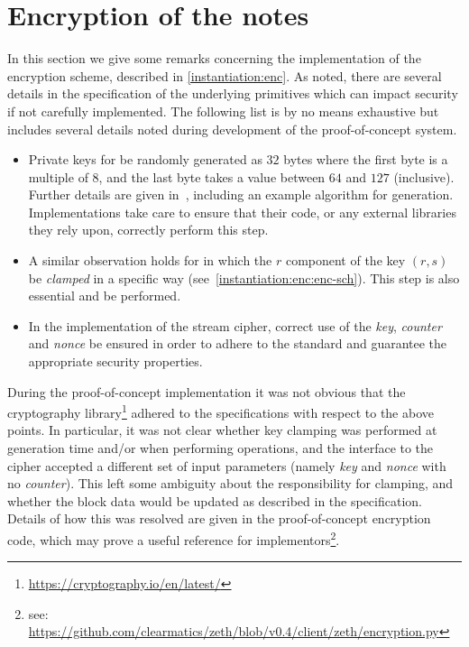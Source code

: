 
\section{Encryption of the notes}\label{implementation:encryption}

In this section we give some remarks concerning the implementation of the \zeth{} encryption scheme, described in \cref{instantiation:enc}. As noted, there are several details in the specification of the underlying primitives which can impact security if not carefully implemented. The following list is by no means exhaustive but includes several details noted during development of the proof-of-concept system.

\begin{itemize}
    \item Private keys for  \MUST{} be randomly generated as $32$ bytes where the first byte is a multiple of $8$, and the last byte takes a value between $64$ and $127$ (inclusive). Further details are given in~\cite{bernstein2006curve25519}, including an example algorithm for generation. Implementations \MUST{} take care to ensure that their code, or any external libraries they rely upon, correctly perform this step.
    \item A similar observation holds for  in which the $r$ component of the \mac{} key $(r, s)$ \MUST{} be \emph{clamped} in a specific way (see~\cref{instantiation:enc:enc-sch}). This step is also essential and \MUST{} be performed.
    \item In the implementation of the \chacha{} stream cipher, correct use of the \emph{key}, \emph{counter} and \emph{nonce} \MUST{} be ensured in order to adhere to the standard and guarantee the appropriate security properties.
\end{itemize}

During the proof-of-concept implementation it was not obvious that the cryptography library\footnote{\url{https://cryptography.io/en/latest/}} adhered to the specifications with respect to the above points. In particular, it was not clear whether key clamping was performed at generation time and/or when performing operations, and the interface to the \chacha{} cipher accepted a different set of input parameters (namely \emph{key} and \emph{nonce} with no \emph{counter}). This left some ambiguity about the responsibility for clamping, and whether the \chacha{} block data would be updated as described in the specification. Details of how this was resolved are given in the proof-of-concept encryption code, which may prove a useful reference for implementors\footnote{see: \url{https://github.com/clearmatics/zeth/blob/v0.4/client/zeth/encryption.py}}.

